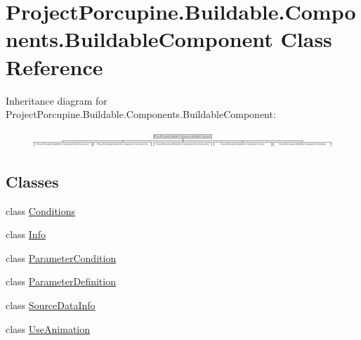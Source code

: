 \hypertarget{class_project_porcupine_1_1_buildable_1_1_components_1_1_buildable_component}{}\section{Project\+Porcupine.\+Buildable.\+Components.\+Buildable\+Component Class Reference}
\label{class_project_porcupine_1_1_buildable_1_1_components_1_1_buildable_component}
Inheritance diagram for Project\+Porcupine.\+Buildable.\+Components.\+Buildable\+Component\+:\begin{figure}[H]
\begin{center}
\leavevmode
\includegraphics[height=0.612022cm]{class_project_porcupine_1_1_buildable_1_1_components_1_1_buildable_component}
\end{center}
\end{figure}
\subsection*{Classes}
\begin{DoxyCompactItemize}
\item 
class \hyperlink{class_project_porcupine_1_1_buildable_1_1_components_1_1_buildable_component_1_1_conditions}{Conditions}
\item 
class \hyperlink{class_project_porcupine_1_1_buildable_1_1_components_1_1_buildable_component_1_1_info}{Info}
\item 
class \hyperlink{class_project_porcupine_1_1_buildable_1_1_components_1_1_buildable_component_1_1_parameter_condition}{Parameter\+Condition}
\item 
class \hyperlink{class_project_porcupine_1_1_buildable_1_1_components_1_1_buildable_component_1_1_parameter_definition}{Parameter\+Definition}
\item 
class \hyperlink{class_project_porcupine_1_1_buildable_1_1_components_1_1_buildable_component_1_1_source_data_info}{Source\+Data\+Info}
\item 
class \hyperlink{class_project_porcupine_1_1_buildable_1_1_components_1_1_buildable_component_1_1_use_animation}{Use\+Animation}
\end{DoxyCompactItemize}
